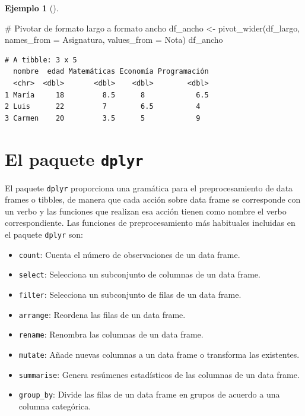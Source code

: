 \documentclass[
  spanish,
  a4paper,
]{scrreport}
\newenvironment{Shaded}{\begin{snugshade}}{\end{snugshade}}
\newcommand{\AttributeTok}[1]{\textcolor[rgb]{0.40,0.45,0.13}{#1}}
\newcommand{\CommentTok}[1]{\textcolor[rgb]{0.37,0.37,0.37}{#1}}
\newcommand{\FunctionTok}[1]{\textcolor[rgb]{0.28,0.35,0.67}{#1}}
\newcommand{\NormalTok}[1]{\textcolor[rgb]{0.00,0.23,0.31}{#1}}
\newcommand{\OtherTok}[1]{\textcolor[rgb]{0.00,0.23,0.31}{#1}}
\providecommand{\tightlist}{%
  \setlength{\itemsep}{0pt}\setlength{\parskip}{0pt}}
\theoremstyle{definition}
\theoremstyle{definition}
\newtheorem{example}{Ejemplo}[chapter]
\theoremstyle{remark}
\begin{document}
\begin{example}[]
\begin{Shaded}
\begin{Highlighting}[]
\CommentTok{\# Pivotar de formato largo a formato ancho}
\NormalTok{df\_ancho }\OtherTok{\textless{}{-}} \FunctionTok{pivot\_wider}\NormalTok{(df\_largo, }\AttributeTok{names\_from =}\NormalTok{ Asignatura, }\AttributeTok{values\_from =}\NormalTok{ Nota)}
\NormalTok{df\_ancho}
\end{Highlighting}
\end{Shaded}

\begin{verbatim}
# A tibble: 3 x 5
  nombre  edad Matemáticas Economía Programación
  <chr>  <dbl>       <dbl>    <dbl>        <dbl>
1 María     18         8.5      8            6.5
2 Luis      22         7        6.5          4  
3 Carmen    20         3.5      5            9  
\end{verbatim}

\end{example}

\section{\texorpdfstring{El paquete
\texttt{dplyr}}{El paquete dplyr}}\label{el-paquete-dplyr}

El paquete \texttt{dplyr} proporciona una gramática para el
preprocesamiento de data frames o tibbles, de manera que cada acción
sobre data frame se corresponde con un verbo y las funciones que
realizan esa acción tienen como nombre el verbo correspondiente. Las
funciones de preprocesamiento más habituales incluidas en el paquete
\texttt{dplyr} son:

\begin{itemize}
\tightlist
\item
  \texttt{count}: Cuenta el número de observaciones de un data frame.
\item
  \texttt{select}: Selecciona un subconjunto de columnas de un data
  frame.
\item
  \texttt{filter}: Selecciona un subconjunto de filas de un data frame.
\item
  \texttt{arrange}: Reordena las filas de un data frame.
\item
  \texttt{rename}: Renombra las columnas de un data frame.
\item
  \texttt{mutate}: Añade nuevas columnas a un data frame o transforma
  las existentes.
\item
  \texttt{summarise}: Genera resúmenes estadísticos de las columnas de
  un data frame.
\item
  \texttt{group\_by}: Divide las filas de un data frame en grupos de
  acuerdo a una columna categórica.
\end{itemize}
\end{document}
